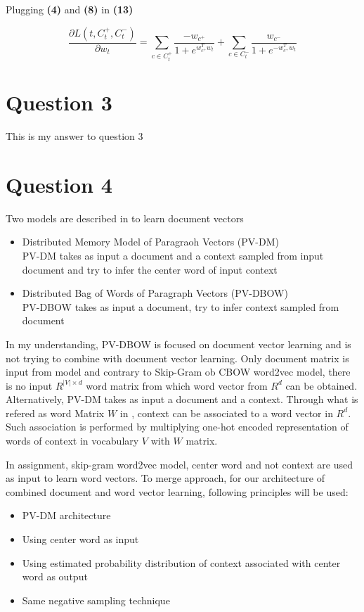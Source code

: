 \documentclass[a4paper]{article}
\begin{document}
Plugging \textbf{(4)} and \textbf{(8)} in \textbf{(13)}

\begin{equation}
\boxed{
\frac{\partial L(t, C_{t}^{+},C_{t}^{-})}{\partial w_{t}} =
\sum_{c \in C_{t}^{+}}
 \frac{-w_{c^{+}}}{1 + e^{w_{c^{+}}^{T}w_{t}}}
+
\sum_{c \in C_{t}^{-}}
 \frac{w_{c^{-}}}{1 + e^{-w_{c^{+}}^{T}w_{t}}}
 }
\end{equation}


\section{Question 3}

This is my answer to question 3

\section{Question 4}
Two models are described in \cite{quocLe2014doc2vec} to learn document vectors
\begin{itemize}
\item Distributed Memory Model of Paragraoh Vectors (PV-DM)\\
PV-DM takes as input a document and a context sampled from input document and try to infer the center word of input context
\item Distributed Bag of Words  of Paragraph Vectors (PV-DBOW)\\
PV-DBOW takes as input a document, try to infer context sampled from document
\end{itemize}

In my understanding, PV-DBOW is focused on document vector learning and is not trying to combine with document vector learning. Only document matrix is input from model and contrary to Skip-Gram ob CBOW word2vec model, there is no input $R^{\vert V \vert \times d}$ word matrix from which word vector from $R^{d}$ can be obtained.\\

Alternatively, PV-DM takes as input a document and a context. Through what is refered as word Matrix $W$ in \cite{quocLe2014doc2vec}, context can be associated to a word vector in $R^{d}$. Such association is performed by multiplying one-hot encoded representation of words of context in vocabulary $V$ with $W$ matrix.

In assignment, skip-gram word2vec model, center word and not context are used as input to learn word vectors. To merge approach, for our architecture of combined document and word vector learning, following principles will be used:
\begin{itemize}
\item PV-DM architecture
\item Using center word as input
\item Using estimated probability distribution of context associated with center word as output
\item Same negative sampling technique
\end{itemize}
\end{document}

